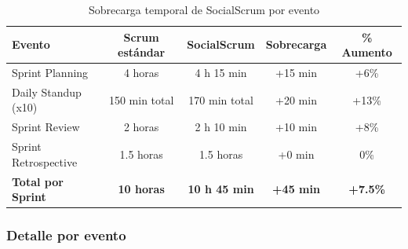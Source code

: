 \begin{table}[h]
    \centering
    \small
    \begin{tabularx}{\textwidth}{|X|c|c|c|c|}
        \hline
        \textbf{Evento} & \textbf{Scrum estándar} & \textbf{SocialScrum} & \textbf{Sobrecarga} & \textbf{\% Aumento} \\
        \hline
        Sprint Planning
                        & 4 horas
                        & 4 h 15 min
                        & +15 min
                        & +6\%                                                                                       \\
        \hline
        Daily Standup (x10)
                        & 150 min total
                        & 170 min total
                        & +20 min
                        & +13\%                                                                                      \\
        \hline
        Sprint Review
                        & 2 horas
                        & 2 h 10 min
                        & +10 min
                        & +8\%                                                                                       \\
        \hline
        Sprint Retrospective
                        & 1.5 horas
                        & 1.5 horas
                        & +0 min
                        & 0\%                                                                                        \\
        \hline
        \textbf{Total por Sprint}
                        & \textbf{10 horas}
                        & \textbf{10 h 45 min}
                        & \textbf{+45 min}
                        & \textbf{+7.5\%}                                                                            \\
        \hline
    \end{tabularx}
    \caption{Sobrecarga temporal de SocialScrum por evento}
    \label{tab:sobrecarga-temporal}
\end{table}
\FloatBarrier

\subsubsection{Detalle por evento}

